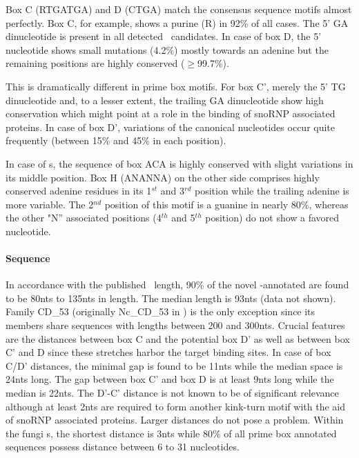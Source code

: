 Box C (RTGATGA) and D (CTGA) match the consensus sequence motifs
almost perfectly. Box C, for example,
shows a purine (R) in 92\% of all cases. The 5' GA dinucleotide is present in all
detected \sno\ candidates. In case of box D, the 5' nucleotide
shows small mutations (4.2\%) mostly towards an adenine but the
remaining positions are highly conserved ($\ge$99.7\%). 

This is dramatically different in prime box
motifs. For box C', merely the 5' TG dinucleotide and, to a lesser extent, the
trailing GA dinucleotide show high conservation which might point at a
 role in the binding of snoRNP associated
proteins. In case of box D', variations of the canonical nucleotides occur quite
frequently (between 15\% and 45\% in each position).

In case of \haca s, the sequence of box ACA is highly conserved with
slight variations in its middle position. Box H (ANANNA) on the other side
comprises highly conserved adenine residues in its 1$^{st}$ and
3$^{rd}$ position while the trailing adenine is more variable. The
2$^{nd}$ position of this motif is a guanine in nearly 80\%, whereas
the other "N'' associated positions (4$^{th}$ and 5$^{th}$ position) do not show a favored nucleotide.

\paragraph{\textbf{Sequence}} In
accordance with the published \cd\ length, 90\% of the novel
\snostrip-annotated  are found to be 80nts to 135nts in length. The
median length is 93nts (data not shown). Family CD\_53 (originally Nc\_CD\_53 in \cite{Joechl:2008}) is the only exception
since its members share sequences with lengths between 200 and
300nts. Crucial features are the distances between box C
and the potential box D'  as well as between box C' and D
since these stretches harbor the target binding sites. In case of box C/D' distances, the
minimal gap is found to be 11nts while the median space is 24nts
long. The gap between box C' and box D is at least 9nts long while the median is
22nts. The D'-C' distance is not known to be of
significant relevance although 
at least 2nts are required to form another kink-turn motif with the aid of snoRNP
associated proteins. Larger distances do not pose a problem. Within
the fungi \sno s, the shortest distance is 3nts while 80\% of all
prime box annotated sequences possess distance between 6 to 31
nucleotides.

